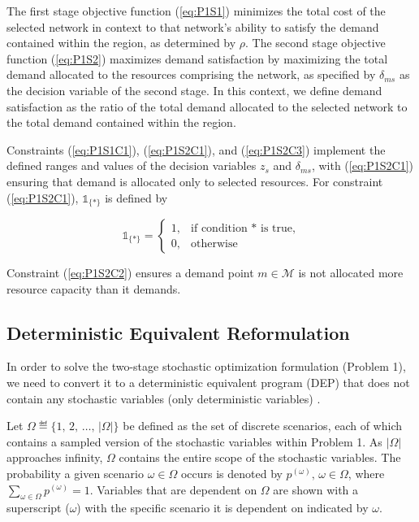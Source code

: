 \documentclass[onecolumn,draftcls]{IEEEtran}
\begin{document}
The first stage objective function (\ref{eq:P1S1}) minimizes the total cost of the selected network in context to that network's ability to satisfy the demand contained within the region, as determined by $\rho$.  The second stage objective function (\ref{eq:P1S2}) maximizes demand satisfaction by maximizing the total demand allocated to the resources comprising the network, as specified by $\delta_{ms}$ as the decision variable of the second stage.  In this context, we define demand satisfaction as the ratio of the total demand allocated to the selected network to the total demand contained within the region.

Constraints (\ref{eq:P1S1C1}), (\ref{eq:P1S2C1}), and (\ref{eq:P1S2C3}) implement the defined ranges and values of the decision variables $z_s$ and $\delta_{ms}$, with (\ref{eq:P1S2C1}) ensuring that demand is allocated only to selected resources.  For constraint (\ref{eq:P1S2C1}), $\mathbb{1}_{\{*\}}$ is defined by

\[ \mathbb{1}_{\{*\}} =
	\begin{cases}
		1,& \text{if condition $*$ is true,}\\
		0,& \text{otherwise}
	\end{cases}
\]

Constraint (\ref{eq:P1S2C2}) ensures a demand point $m \in \mathcal{M}$ is not allocated more resource capacity than it demands.

\subsection{Deterministic Equivalent Reformulation} \label{subsec:dep}

In order to solve the two-stage stochastic optimization formulation (Problem 1), we need to convert it to a deterministic equivalent program (DEP) that does not contain any stochastic variables (only deterministic variables) \cite{stochprogramming}.

Let $ \Omega \eqdef \{1,\, 2,\, \ldots,\, |\Omega|\} $ be defined as the set of discrete scenarios, each of which contains a sampled version of the stochastic variables within Problem 1.  As $|\Omega|$ approaches infinity, $\Omega$ contains the entire scope of the stochastic variables.  The probability a given scenario $\omega \in \Omega$ occurs is denoted by $p^{(\omega)},\, \omega \in \Omega$, where $\sum_{\omega \in \Omega} p^{(\omega)} = 1$.  Variables that are dependent on $\Omega$ are shown with a superscript ($\omega$) with the specific scenario it is dependent on indicated by $\omega$.
\end{document}
